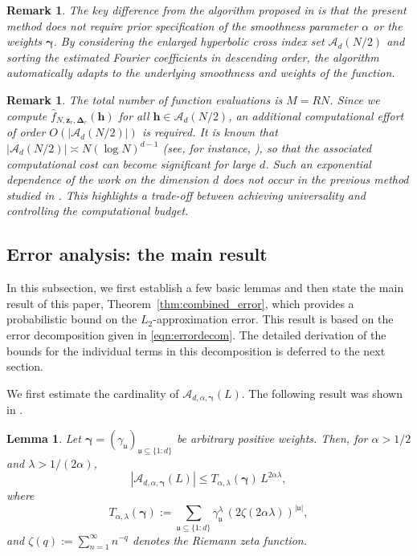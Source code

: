 \documentclass[a4paper,11pt]{article}
\newtheorem{lemma}[theorem]{Lemma}
\newtheorem{remark}[theorem]{Remark}
\newcommand{\bsh}{\boldsymbol{h}}
\newcommand{\bsz}{\boldsymbol{z}}
\newcommand{\bsgamma}{\boldsymbol{\gamma}}
\newcommand{\bsDelta}{\boldsymbol{\Delta}}
\newcommand{\Acal}{\mathcal{A}}
\newcommand{\fraku}{\mathfrak{u}}
\newcommand{\abs}[1]{\left\vert#1\right\vert}
\begin{document}
\begin{remark}
The key difference from the algorithm proposed in \cite{PKG24} is that the present method does not require prior specification of the smoothness parameter $\alpha$ or the weights $\bsgamma$. 
By considering the enlarged hyperbolic cross index set $\Acal_d(N/2)$ and sorting the estimated Fourier coefficients in descending order, the algorithm automatically adapts to the underlying smoothness and weights of the function.
\end{remark}

\begin{remark}\label{rem:evaluation_vs_work}
The total number of function evaluations is $M = R N$. 
Since we compute $\widehat{f}_{N,\bsz_r,\bsDelta_r}(\bsh)$ for all $\bsh \in \Acal_{d}(N/2)$, an additional computational effort of order $O(|\Acal_{d}(N/2)|)$ is required. 
It is known that $|\Acal_{d}(N/2)| \asymp N (\log N)^{d-1}$ (see, for instance, \cite[Chapter~2]{DTU18}), so that the associated computational cost can become significant for large $d$. 
Such an exponential dependence of the work on the dimension $d$ does not occur in the previous method studied in \cite{PKG24}.
This highlights a trade-off between achieving universality and controlling the computational budget.
\end{remark}

\subsection{Error analysis: the main result}

In this subsection, we first establish a few basic lemmas and then state the main result of this paper, Theorem~\ref{thm:combined_error}, which provides a probabilistic bound on the $L_2$-approximation error. This result is based on the error decomposition given in \eqref{eqn:errordecom}. The detailed derivation of the bounds for the individual terms in this decomposition is deferred to the next section.

We first estimate the cardinality of 
$\Acal_{d,\alpha,\bsgamma}(L)$. The following result was shown in \cite{CKNS20}.
\begin{lemma} \label{lem:calA_bound}
Let $\bsgamma=(\gamma_{\fraku})_{\fraku\subseteq \{1{:}d\}}$ 
be arbitrary positive weights. Then, for $\alpha>1/2$ and $\lambda > 1/(2\alpha)$,
\[
\abs{\Acal_{d,\alpha,\bsgamma}(L)} \leq 
T_{\alpha,\lambda}(\bsgamma)\, L^{2 \alpha\lambda} ,
\]
where 
\[
T_{\alpha,\lambda}(\bsgamma):=\sum_{\fraku\subseteq \{1:d\}} 
\gamma_{\fraku}^\lambda\, (2\zeta (2\alpha\lambda))^{\abs{\fraku}},
\]
and $\zeta(q):=\sum_{n=1}^\infty n^{-q}$ denotes the Riemann zeta function.
\end{lemma}
\end{document}
